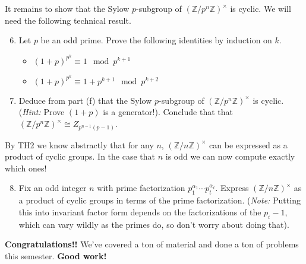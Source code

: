 \documentclass[11pt]{article}
\newcommand{\bZ}{\mathbb{Z}}
\begin{document}
\begin{enumerate}
{  It remains to show that the Sylow $p$-subgroup of $(\bZ/p^n\bZ)^\times$ is cyclic.  We will need the following technical result.
  \begin{enumerate}
    \setcounter{enumii}{5}
    \item{
    Let $p$ be an odd prime.  Prove the following identities by induction on $k$.
    \begin{itemize}
      \item{$(1+p)^{p^k}\equiv 1\mod p^{k+1}$}
      \item{$(1+p)^{p^k}\equiv1+p^{k+1}\mod p^{k+2}$}
    \end{itemize}
    }
    \item{
    Deduce from part (f) that the Sylow $p$-subgroup of $(\bZ/p^n\bZ)^\times$ is cyclic.  (\textit{Hint:} Prove $(1+p)$ is a generator!).  Conclude that that $(\bZ/p^n\bZ)^\times\cong Z_{p^{n-1}(p-1)}$.
    }
  \end{enumerate}
  By TH2 we know abstractly that for any $n$, $(\bZ/n\bZ)^\times$ can be expressed as a product of cyclic groups.  In the case that $n$ is odd we can now compute exactly which ones!
  \begin{enumerate}
    \setcounter{enumii}{7}
    \item{
    Fix an odd integer $n$ with prime factorization $p_1^{\alpha_1}\cdots p_t^{\alpha_t}$.  Express $(\bZ/n\bZ)^\times$ as a product of cyclic groups in terms of the prime factorization.  (\textit{Note:} Putting this into invariant factor form depends on the factorizations of the $p_i-1$, which can vary wildly as the primes do, so don't worry about doing that).
    }
  \end{enumerate}
  }
\end{enumerate}
\textbf{Congratulations!!}  We've covered a ton of material and done a ton of problems this semester.  \textbf{Good work!}
\end{document}
